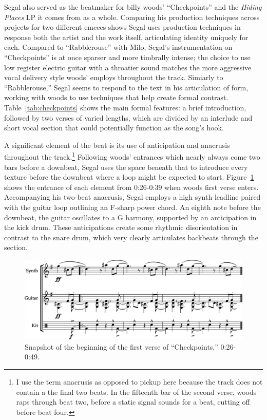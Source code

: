 Segal also served as the beatmaker for billy woods' ``Checkpoints'' and the \textit{Hiding Places} LP it comes from as a whole. Comparing his production techniques across projects for two different emcees shows Segal uses production techniques in response both the artist and the work itself, articulating identity uniquely for each. Compared to ``Rabblerouse'' with Milo, Segal's instrumentation on ``Checkpoints'' is at once sparser and more timbrally intense; the choice to use low register electric guitar with a throatier sound matches the more aggressive vocal delivery style woods' employs throughout the track. Simiarly to ``Rabblerouse,'' Segal seems to respond to the text in his articulation of form, working with woods to use techniques that help create formal contrast. Table~\ref{tab:checkpoints} shows the main formal features: a brief introduction, followed by two verses of varied lengths, which are divided by an interlude and short vocal section that could potentially function as the song's hook.

A significant element of the beat is its use of anticipation and anacrusis throughout the track.\footnote{I use the term anacrusis as opposed to pickup here because the track does not contain a the final two beats. In the fifteenth bar of the second verse, woods raps through beat two, before a static signal sounds for a beat, cutting off before beat four.} Following woods' entrances which nearly always come two bars before a downbeat, Segal uses the space beneath that to introduce every texture before the downbeat where a loop might be expected to start. Figure~\ref{fig:checkpointsintro} shows the entrance of each element from 0:26-0:39 when woods first verse enters. Accompanying his two-beat anacrusis, Segal employs a high synth leadline paired with the guitar loop outlining an F-sharp power chord. An eighth note before the downbeat, the guitar oscillates to a G harmony, supported by an anticipation in the kick drum. These anticipations create some rhythmic disorientation in contrast to the snare drum, which very clearly articulates backbeats through the section.

    \begin{figure}[ht]
        \centering
        \includegraphics[width=\textwidth]{images/figures/chp 02/026039checkpointsintro.pdf}
        \caption{Snapshot of the beginning of the first verse of ``Checkpoints,'' 0:26-0:49.}
        \label{fig:checkpointsintro}
    \end{figure}

